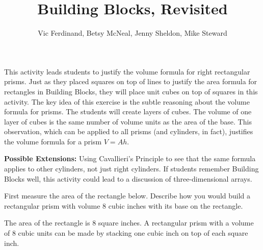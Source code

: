 \documentclass{ximera}
\title{Building Blocks, Revisited}
\author{Vic Ferdinand, Betsy McNeal, Jenny Sheldon, Mike Steward}
\begin{document}
\begin{abstract}
\end{abstract}
\maketitle

\begin{instructorIntro}
This activity leads students to justify the volume formula for right rectangular prisms.  Just as they placed squares on top of lines to justify the area formula for rectangles in Building Blocks, they will place unit cubes on top of squares in this activity.  The key idea of this exercise is the subtle reasoning about the volume formula for prisms.  The students will create layers of cubes.  The volume of one layer of cubes is the same number of volume units as the area of the base.  This observation, which can be applied to all prisms (and cylinders, in fact), justifies the volume formula for a prism $V = Ah$.


{\bf Possible Extensions:}
Using Cavallieri's Principle to see that the same formula applies to other cylinders, not just right cylinders. If students remember Building Blocks well, this activity could lead to a discussion of three-dimensional arrays.

\end{instructorIntro}


\begin{problem}
First measure the area of the rectangle below.  Describe how you would build a rectangular prism with volume $8$ cubic inches with its base on the rectangle.


\begin{solution}
The area of the rectangle is 8 square inches.  A rectangular prism with a volume of 8 cubic units can be made by stacking one cubic inch on top of each square inch.
\end{solution}
\end{problem}
\end{document}
